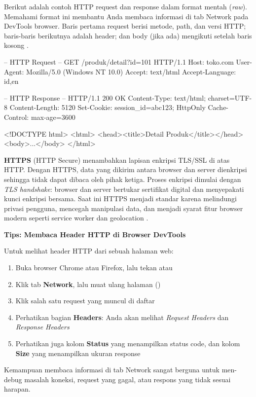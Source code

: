 Berikut adalah contoh HTTP request dan response dalam format mentah (\textit{raw}). Memahami format ini membantu Anda membaca informasi di tab Network pada DevTools browser. Baris pertama request berisi metode, path, dan versi HTTP; baris-baris berikutnya adalah header; dan body (jika ada) mengikuti setelah baris kosong \cite{mdnLearn}.

\begin{webcode}[language=Bash, caption={Contoh HTTP request dan response (format mentah)}]
-- HTTP Request --
GET /produk/detail?id=101 HTTP/1.1
Host: toko.com
User-Agent: Mozilla/5.0 (Windows NT 10.0)
Accept: text/html
Accept-Language: id,en

-- HTTP Response --
HTTP/1.1 200 OK
Content-Type: text/html; charset=UTF-8
Content-Length: 5120
Set-Cookie: session_id=abc123; HttpOnly
Cache-Control: max-age=3600

<!DOCTYPE html>
<html>
<head><title>Detail Produk</title></head>
<body>...</body>
</html>
\end{webcode}

\textbf{HTTPS} (HTTP Secure) menambahkan lapisan enkripsi TLS/SSL di atas HTTP. Dengan HTTPS, data yang dikirim antara browser dan server dienkripsi sehingga tidak dapat dibaca oleh pihak ketiga. Proses enkripsi dimulai dengan \textit{TLS handshake}: browser dan server bertukar sertifikat digital dan menyepakati kunci enkripsi bersama. Saat ini HTTPS menjadi standar karena melindungi privasi pengguna, mencegah manipulasi data, dan menjadi syarat fitur browser modern seperti service worker dan geolocation \cite{mdnLearn}.

\begin{catatan}
\textbf{Tips: Membaca Header HTTP di Browser DevTools}

Untuk melihat header HTTP dari sebuah halaman web:
\begin{enumerate}
  \item Buka browser Chrome atau Firefox, lalu tekan  atau 
  \item Klik tab \textbf{Network}, lalu muat ulang halaman ()
  \item Klik salah satu request yang muncul di daftar
  \item Perhatikan bagian \textbf{Headers}: Anda akan melihat \textit{Request Headers} dan \textit{Response Headers}
  \item Perhatikan juga kolom \textbf{Status} yang menampilkan status code, dan kolom \textbf{Size} yang menampilkan ukuran response
\end{enumerate}
Kemampuan membaca informasi di tab Network sangat berguna untuk men-debug masalah koneksi, request yang gagal, atau respons yang tidak sesuai harapan.
\end{catatan}

